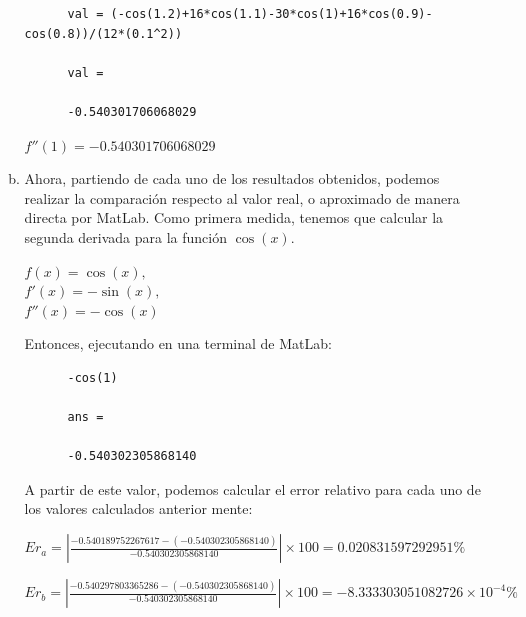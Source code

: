 \documentclass[english,notitlepage,letterpaper, 10pt]{article} %
\begin{document}
\begin{enumerate}
\begin{enumerate}[a)]
    \begin{lstlisting}  
      val = (-cos(1.2)+16*cos(1.1)-30*cos(1)+16*cos(0.9)-cos(0.8))/(12*(0.1^2)) 
      
      val = 
      
      -0.540301706068029  
    \end{lstlisting}  
    
    \begin{center}  
      \begin{math}  
        f''(1) = -0.540301706068029 
      \end{math}  
    \end{center}  
    
    \item Ahora, partiendo de cada uno de los resultados obtenidos, podemos realizar la comparación respecto al valor real, o aproximado de manera directa por MatLab. Como primera medida, tenemos que calcular la segunda derivada para la función $\cos(x)$. 
    
    \begin{center}  
      $f(x) = \cos(x),$ \\  
      $f'(x) = -\sin(x),$ \\  
      $f''(x) = -\cos(x)$ 
    \end{center}  
    
    Entonces, ejecutando en una terminal de MatLab: 
    
    \begin{lstlisting}  
      -cos(1)   
      
      ans = 
      
      -0.540302305868140  
    \end{lstlisting}  
    
    A partir de este valor, podemos calcular el error relativo para cada uno de los valores calculados anterior mente:  
    
    \begin{center}  
      \begin{math}  
        Er_a = \displaystyle \left| \frac{-0.540189752267617-(-0.540302305868140)}{-0.540302305868140} \right| \times 100 = 0.020831597292951\% 
      \end{math}  
      
      \begin{math}  
        Er_b = \displaystyle \left| \frac{-0.540297803365286-(-0.540302305868140)}{-0.540302305868140} \right| \times 100 = -8.333303051082726 \times 10^{-4} \%  
      \end{math}  
      

\end{center}
\end{enumerate}
\end{enumerate}
\end{document}
